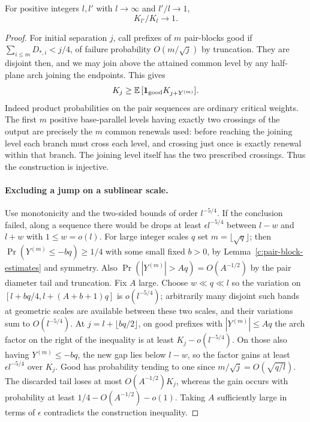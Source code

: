 \begin{lemma}\label{c:arch-kernel-regularity}
For positive integers $l,l'$ with $l\to\infty$ and $l'/l\to1$,
\[
 K_{l'}/K_l\longrightarrow1.
\]
\end{lemma}
\begin{proof}
For initial separation \(j\), call prefixes of \(m\) pair-blocks good if \(\sum_{i\le m}D_{*,i}<j/4\), of failure probability \(O(m/\sqrt j)\) by truncation. They are disjoint then, and we may join above the attained common level by any half-plane arch joining the endpoints. This gives
\[
 K_j\ge \mathbb E\,[{\bf1}_{\rm good} K_{j+Y^{(m)}}].
\]
Indeed product probabilities on the pair sequences are ordinary critical weights. The first \(m\) positive base-parallel levels having exactly two crossings of the output are precisely the \(m\) common renewals used: before reaching the joining level each branch must cross each level, and crossing just once is exactly renewal within that branch. The joining level itself has the two prescribed crossings. Thus the construction is injective.



\paragraph{Excluding a jump on a sublinear scale.}
Use monotonicity and the two-sided bounds of order \(l^{-5/4}\). If the conclusion failed, along a sequence there would be drops at least \(\epsilon l^{-5/4}\) between \(l-w\) and \(l+w\) with \(1\le w=o(l)\). For large integer scales \(q\) set \(m=\lfloor\sqrt q\rfloor\); then \(\Pr(Y^{(m)}\le -b q)\ge1/4\) with some small fixed \(b>0\), by Lemma~\ref{c:pair-block-estimates} and symmetry. Also \(\Pr(|Y^{(m)}|>Aq)=O(A^{-1/2})\) by the pair diameter tail and truncation. Fix \(A\) large. Choose \(w\ll q\ll l\) so the variation on \([l+ bq/4,l+(A+b+1)q]\) is \(o(l^{-5/4})\); arbitrarily many disjoint such bands at geometric scales are available between these two scales, and their variations sum to \(O(l^{-5/4})\). At \(j=l+\lfloor bq/2\rfloor\), on good prefixes with \(|Y^{(m)}|\le A q\) the arch factor on the right of the inequality is at least \(K_j-o(l^{-5/4})\). On those also having \(Y^{(m)}\le-bq\), the new gap lies below $l-w$, so the factor gains at least \(\epsilon l^{-5/4}\) over \(K_j\). Good has probability tending to one since $m/\sqrt j=O(\sqrt{q/l})$. The discarded tail loses at most $O(A^{-1/2})K_j$, whereas the gain occurs with probability at least $1/4-O(A^{-1/2})-o(1)$. Taking \(A\) sufficiently large in terms of \(\epsilon\) contradicts the construction inequality.
\end{proof}



